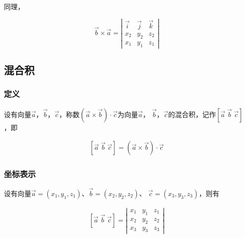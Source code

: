 \documentclass[
	11pt, %
	a4paper, %
]{WhuSakuraBook}
\begin{document}
    同理，

    \[
        \overrightarrow{b} \times \overrightarrow{a} =
        \left|
            \begin{array}{cccc}
            \overrightarrow{i} & \overrightarrow{j} & \overrightarrow{k} \\
            x_2 & y_2 & z_2 \\
            x_1 & y_1 & z_1
            \end{array}
        \right|
    \]

\subsection{混合积}

\subsubsection{定义}

    设有向量\(\overrightarrow{a}\)，\(\overrightarrow{b}\)，\(\overrightarrow{c}\)，称数\(\left(\overrightarrow{a}
    \times \overrightarrow{b}\right) \cdot \overrightarrow{c}\)为向量\(\overrightarrow{a}\)，
	\(\overrightarrow{b}\)，\(\overrightarrow{c}\)的混合积，记作\(\left[\overrightarrow{a} \; \overrightarrow{b} \;
    \overrightarrow{c}\right]\)，即

    \begin{align}
        \left[\overrightarrow{a} \; \overrightarrow{b} \; \overrightarrow{c}\right] =
        \left(\overrightarrow{a} \times \overrightarrow{b}\right) \cdot \overrightarrow{c}
    \end{align}

\subsubsection{坐标表示}

    设有向量\(\overrightarrow{a} = \left(x_1, y_1, z_1\right)\)、\(\overrightarrow{b} = \left(x_2, y_2, z_2\right)\)、
    \(\overrightarrow{c} = \left(x_3, y_3, z_3\right)\)，则有

    \begin{align}
        \left[\overrightarrow{a} \; \overrightarrow{b} \; \overrightarrow{c}\right] =
        \left|
            \begin{array}{cccc}
            x_1 & y_1 & z_1 \\
            x_2 & y_2 & z_2 \\
            x_3 & y_3 & z_3
            \end{array}
        \right|
    \end{align}
\end{document}

